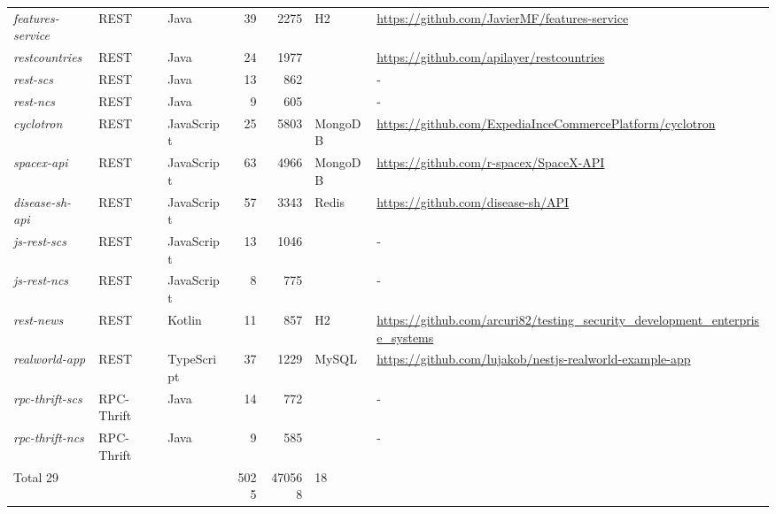 \begin{tabular}{lll rr ll}
\emph{features-service} &  REST &  Java &  39 &  2275 &  H2 & \url{https://github.com/JavierMF/features-service} \\ 
\emph{restcountries} &  REST &  Java &  24 &  1977 &   & \url{https://github.com/apilayer/restcountries} \\ 
\emph{rest-scs} &  REST &  Java &  13 &  862 &   & -  \\ 
\emph{rest-ncs} &  REST &  Java &  9 &  605 &   & -  \\ 
\emph{cyclotron} &  REST &  JavaScript &  25 &  5803 &  MongoDB & \url{https://github.com/ExpediaInceCommercePlatform/cyclotron} \\ 
\emph{spacex-api} &  REST &  JavaScript &  63 &  4966 &  MongoDB & \url{https://github.com/r-spacex/SpaceX-API} \\ 
\emph{disease-sh-api} &  REST &  JavaScript &  57 &  3343 &  Redis & \url{https://github.com/disease-sh/API} \\ 
\emph{js-rest-scs} &  REST &  JavaScript &  13 &  1046 &   & -  \\ 
\emph{js-rest-ncs} &  REST &  JavaScript &  8 &  775 &   & -  \\ 
\emph{rest-news} &  REST &  Kotlin &  11 &  857 &  H2 & \url{https://github.com/arcuri82/testing_security_development_enterprise_systems} \\ 
\emph{realworld-app} &  REST &  TypeScript &  37 &  1229 &  MySQL & \url{https://github.com/lujakob/nestjs-realworld-example-app} \\ 
\emph{rpc-thrift-scs} &  RPC-Thrift &  Java &  14 &  772 &   & -  \\ 
\emph{rpc-thrift-ncs} &  RPC-Thrift &  Java &  9 &  585 &   & -  \\ 
\midrule 
Total 29 & & & 5025 & 470568 & 18 &  \\ 
\bottomrule 
\end{tabular} 
